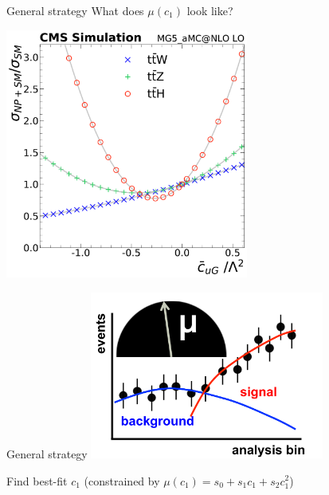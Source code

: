 \documentclass[professionalfont,fleqn]{beamer}
\begin{document}
\begin{frame}{General strategy}
  \centering
  What does $\mu(c_1)$ look like?

  \includegraphics[width=0.6\textwidth]{figures/scaling/cuG}
\end{frame}

\begin{frame}{General strategy}
  \centering
  \includegraphics[height=5.5cm]{figures/cartoon-3}

  Find best-fit $c_1$ (constrained by $\mu(c_1) = s_0 + s_1c_1 + s_2c_1^2$)
\end{frame}
\end{document}
